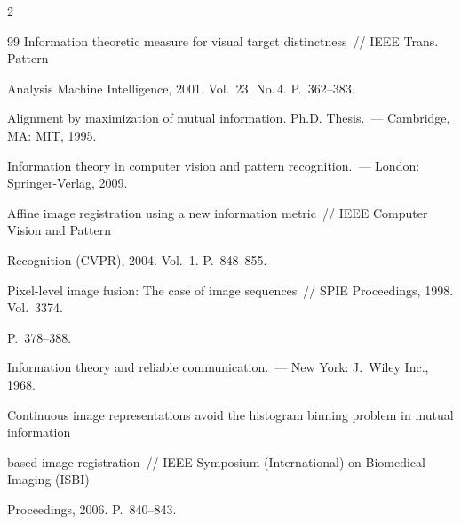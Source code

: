 \begin{multicols}{2}
{{\begin{thebibliography}{99}
Information theoretic measure for visual target distinctness~// IEEE Trans. Pattern 


Analysis Machine Intelligence, 2001. Vol.~23. No.\,4. P.~362--383.









Alignment by maximization of mutual information. Ph.D. Thesis.~--- Cambridge, MA: MIT, 1995.









Information theory in computer vision and pattern recognition.~--- London: Springer-Verlag, 2009.









Affine image registration using a new information metric~// IEEE Computer Vision and Pattern 


Recognition (CVPR), 2004. Vol.~1. P.~848--855.









Pixel-level image fusion: The case of image sequences~// SPIE Proceedings, 1998. Vol.~3374. 


P.~378--388.









Information theory and reliable communication.~--- New York: J.\ Wiley Inc., 1968.









Continuous image representations avoid the histogram binning problem in mutual information 


based image registration~// IEEE Symposium (International) on Biomedical Imaging \mbox{(ISBI)} 


Proceedings, 2006. P.~840--843.






\end{thebibliography}}}
\end{multicols}
